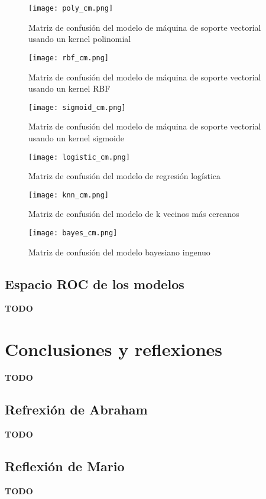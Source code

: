 \documentclass[sigconf,authorversion,nonacm]{acmart}
\begin{document}
\begin{figure}[H]
  \centering
  \texttt{[image: poly\_cm.png]}
  \caption{Matriz de confusión del modelo de máquina de soporte vectorial usando un kernel polinomial}
\end{figure}

\begin{figure}[H]
  \centering
  \texttt{[image: rbf\_cm.png]}
  \caption{Matriz de confusión del modelo de máquina de soporte vectorial usando un kernel RBF}
\end{figure}

\begin{figure}[H]
  \centering
  \texttt{[image: sigmoid\_cm.png]}
  \caption{Matriz de confusión del modelo de máquina de soporte vectorial usando un kernel sigmoide}
\end{figure}

\begin{figure}[H]
  \centering
  \texttt{[image: logistic\_cm.png]}
  \caption{Matriz de confusión del modelo de regresión logística}
\end{figure}

\begin{figure}[H]
  \centering
  \texttt{[image: knn\_cm.png]}
  \caption{Matriz de confusión del modelo de k vecinos más cercanos}
\end{figure}

\begin{figure}[H]
  \centering
  \texttt{[image: bayes\_cm.png]}
  \caption{Matriz de confusión del modelo bayesiano ingenuo}
\end{figure}

\subsection{Espacio ROC de los modelos}
\textbf{TODO}


\section{Conclusiones y reflexiones}
\textbf{TODO}

\subsection{Refrexión de Abraham}
\textbf{TODO}

\subsection{Reflexión de Mario}
\textbf{TODO}
\end{document}
